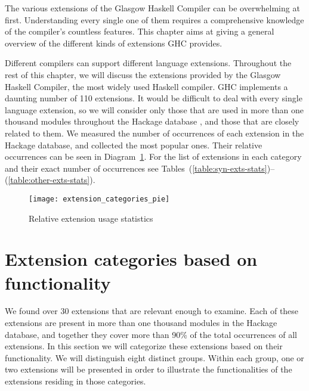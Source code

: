 \documentclass[main.tex]{subfiles}
\begin{document}
	
	
	The various extensions of the Glasgow Haskell Compiler can be overwhelming at first. Understanding every single one of them requires a comprehensive knowledge of the compiler's countless features. This chapter aims at giving a general overview of the different kinds of extensions GHC provides.
	
	Different compilers can support different language extensions. Throughout the rest of this chapter, we will discuss the extensions provided by the Glasgow Haskell Compiler, the most widely used Haskell compiler. GHC implements a daunting number of 110 extensions. It would be difficult to deal with every single language extension, so we will consider only those that are used in more than one thousand modules throughout the Hackage database \cite{hackage-bib}, and those that are closely related to them. We measured the number of occurrences of each extension in the Hackage database, and collected the most popular ones. Their relative occurrences can be seen in Diagram~\ref{fig:rel-ext-piechart}. For the list of extensions in each category and their exact number of occurrences see Tables~(\ref{table:syn-exts-stats})--(\ref{table:other-exts-stats}).
	
	\begin{figure}[h]
		\renewcommand{\figurename}{Diagram}
		\hspace{-1cm}
		\centering
		\caption{Relative extension usage statistics}
		\texttt{[image: extension\_categories\_pie]}
		\label{fig:rel-ext-piechart}
	\end{figure}
	
	\section{Extension categories based on functionality} \label{extension-categories}
	
	We found over 30 extensions that are relevant enough to examine. Each of these extensions are present in more than one thousand modules in the Hackage database, and together they cover more than 90\% of the total occurrences of all extensions. In this section we will categorize these extensions based on their functionality. We will distinguish eight distinct groups. Within each group, one or two extensions will be presented in order to illustrate the functionalities of the extensions residing in those categories.
	
\end{document}
